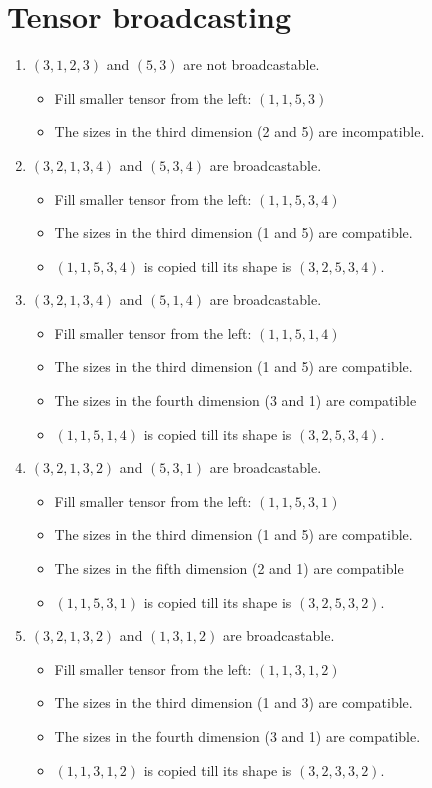 \documentclass[9pt]{article}
\begin{document}
\section{Tensor broadcasting}
\begin{enumerate}
\item $(3,1,2,3)$ and $(5,3)$ are not broadcastable.
\begin{itemize}
	\item Fill smaller tensor from the left: $(1,1,5,3)$
	\item The sizes in the third dimension (2 and 5) are incompatible.
\end{itemize}

\item $(3,2,1,3,4)$ and $(5,3,4)$ are broadcastable.
\begin{itemize}
	\item Fill smaller tensor from the left: $(1,1,5,3,4)$
	\item The sizes in the third dimension (1 and 5) are compatible.
	\item $(1,1,5,3,4)$ is copied till its shape is $(3,2,5,3,4)$.
\end{itemize}

\item $(3,2,1,3,4)$ and $(5,1,4)$ are broadcastable.
\begin{itemize}
	\item Fill smaller tensor from the left: $(1,1,5,1,4)$
	\item The sizes in the third dimension (1 and 5) are compatible.
	\item The sizes in the fourth dimension (3 and 1) are compatible
	\item $(1,1,5,1,4)$ is copied till its shape is $(3,2,5,3,4)$.
\end{itemize}

\item $(3,2,1,3,2)$ and $(5,3,1)$ are broadcastable.
\begin{itemize}
	\item Fill smaller tensor from the left: $(1,1,5,3,1)$
	\item The sizes in the third dimension (1 and 5) are compatible.
	\item The sizes in the fifth dimension (2 and 1) are compatible
	\item $(1,1,5,3,1)$ is copied till its shape is $(3,2,5,3,2)$.
\end{itemize}

\item $(3,2,1,3,2)$ and $(1,3,1,2)$ are broadcastable.
\begin{itemize}
	\item Fill smaller tensor from the left: $(1,1,3,1,2)$
	\item The sizes in the third dimension (1 and 3) are compatible.
	\item The sizes in the fourth dimension (3 and 1) are compatible.
	\item $(1,1,3,1,2)$ is copied till its shape is $(3,2,3,3,2)$.
\end{itemize}


\end{enumerate}
\end{document}
